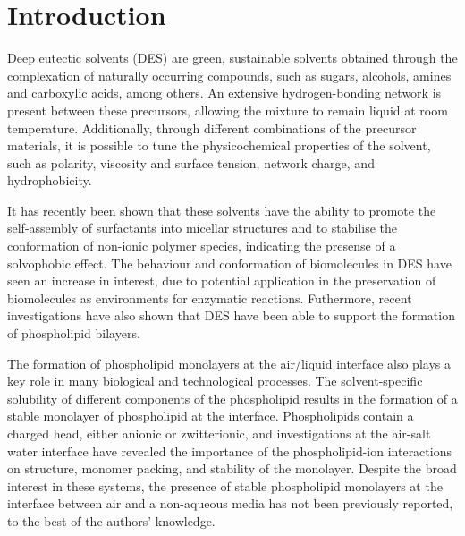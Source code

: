 \documentclass[twoside,twocolumn,9pt]{article}
\begin{document}

\section{Introduction}
Deep eutectic solvents (DES) are green, sustainable solvents obtained through the complexation of naturally occurring compounds, such as sugars, alcohols, amines and carboxylic acids, among others.\cite{Smith2014, Dai2013} An extensive hydrogen-bonding network is present between these precursors, allowing the mixture to remain liquid at room temperature.\cite{Hammond2016, Hammond2017, Araujo2017} Additionally, through different combinations of the precursor materials, it is possible to tune the physicochemical properties of the solvent, such as polarity,\cite{Pandey2014} viscosity and surface tension,\cite{Smith2014} network charge,\cite{Zahn2016} and hydrophobicity.\cite{Ribeiro2015,vanOsch2015}

It has recently been shown that these solvents have the ability to promote the self-assembly of surfactants into micellar structures\cite{Sanchez-Fernandez2016,Arnold2015} and to stabilise the conformation of non-ionic polymer species,\cite{Sapir2016} indicating the presense of a solvophobic effect. The behaviour and conformation of biomolecules in DES have seen an increase in interest,\cite{Esquembre2013,Gorke2010,Gorke2008,Monhami2014,Wu2014,Harifi-Mood2017,Milano2017,Sanchez-Fernandez2017} due to potential application in the preservation of biomolecules as environments for enzymatic reactions.\cite{Merza2018} Futhermore, recent investigations have also shown that DES have been able to support the formation of phospholipid bilayers.\cite{Bryant2017,Bryant2016,Gutierrez2009}

The formation of phospholipid monolayers at the air/liquid interface also plays a key role in many biological and technological processes. The solvent-specific solubility of different components of the phospholipid results in the formation of a stable monolayer of phospholipid at the interface.\cite{Mohwald1990} Phospholipids contain a charged head, either anionic or zwitterionic, and investigations at the air-salt water interface have revealed the importance of the phospholipid-ion interactions on structure, monomer packing, and stability of the monolayer.\cite{Mohwald1990,Kewalramani2010} Despite the broad interest in these systems, the presence of stable phospholipid monolayers at the interface between air and a non-aqueous media has not been previously reported, to the best of the authors' knowledge.
\end{document}
